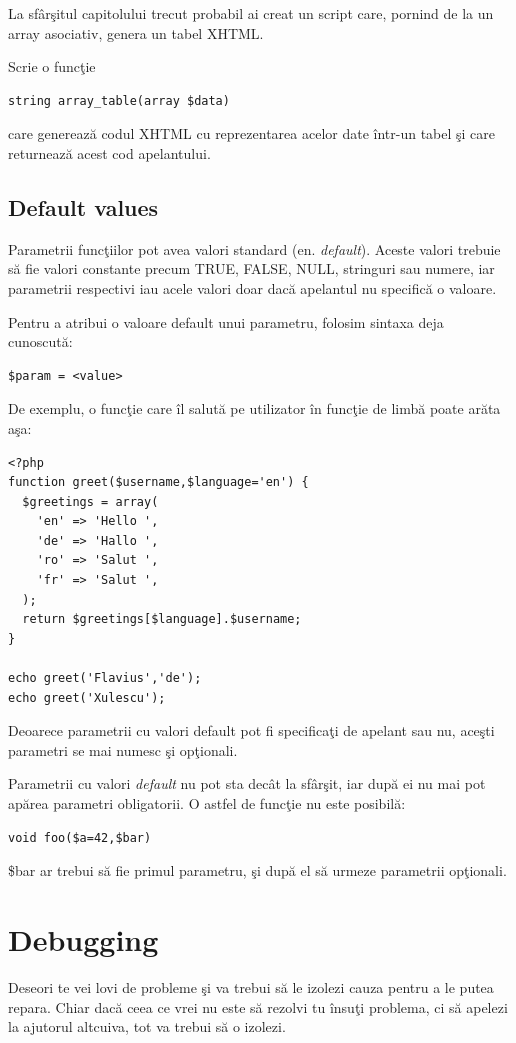 \begin{Exercise}[title={Afişarea unui array bidimensional}]
La sfârşitul capitolului trecut probabil ai creat un script
care, pornind de la un array asociativ, genera un tabel XHTML.

Scrie o funcţie
\begin{verbatim}
string array_table(array $data)
\end{verbatim}
care generează codul XHTML cu reprezentarea acelor date într-un tabel
şi care returnează acest cod apelantului.
\end{Exercise}

\subsection{Default values}
Parametrii funcţiilor pot avea valori standard (en. \textsl{default}).
Aceste valori trebuie să fie valori constante precum TRUE, FALSE, NULL,
stringuri sau numere, iar parametrii respectivi iau acele valori doar
dacă apelantul nu specifică o valoare.

Pentru a atribui o valoare default unui parametru, folosim sintaxa deja
cunoscută:
\begin{verbatim}
$param = <value>
\end{verbatim}

De exemplu, o funcţie care îl salută pe utilizator în funcţie de limbă
poate arăta aşa:

\begin{lstlisting}
<?php
function greet($username,$language='en') {
  $greetings = array(
	'en' => 'Hello ',
	'de' => 'Hallo ',
	'ro' => 'Salut ',
	'fr' => 'Salut ',
  );
  return $greetings[$language].$username;
}

echo greet('Flavius','de');
echo greet('Xulescu');
\end{lstlisting}
Deoarece parametrii cu valori default pot fi specificaţi de
apelant sau nu, aceşti parametri se mai numesc şi opţionali.

Parametrii cu valori \textit{default} nu pot sta decât
la sfârşit, iar după ei nu mai pot
apărea parametri obligatorii. O astfel de funcţie nu este posibilă:
\begin{verbatim}
void foo($a=42,$bar)
\end{verbatim}
\$bar ar trebui să fie primul parametru, şi după el să urmeze parametrii opţionali.

\section{Debugging}
Deseori te vei lovi de probleme şi va trebui să le izolezi cauza
pentru a le putea repara. Chiar dacă ceea ce vrei nu este să
rezolvi tu însuţi problema, ci să apelezi la ajutorul altcuiva,
tot va trebui să o izolezi.

